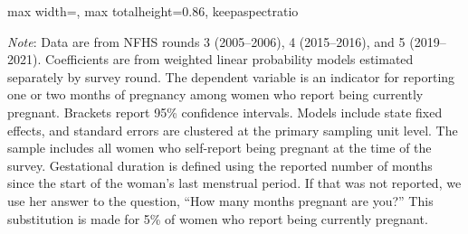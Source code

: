 \documentclass[10pt,twoside,reqno]{article}
\begin{document}
\begin{table}[H]
\sansmath
\sffamily
\captionsetup{style=CAPTAB}
\caption{Women reporting one or two months of pregnancy differ from women reporting later pregnancy}
\label{tab:earlypregnancy}
\vspace{-8pt}

\begin{center}
\begin{scriptsize}
\setlength{\tabcolsep}{10pt}
\renewcommand{\arraystretch}{0.9}
\begin{adjustbox}{max width=\textwidth, max totalheight=0.86\textheight, keepaspectratio}

\end{adjustbox}
\end{scriptsize}
\end{center}

\vspace{0.5ex}
\vspace{0.5ex}
\small\scriptsize{\textsf{\textit{Note}: Data are from NFHS rounds 3 (2005--2006), 4 (2015--2016), and 5 (2019--2021). Coefficients are from weighted linear probability models estimated separately by survey round. The dependent variable is an indicator for reporting one or two months of pregnancy among women who report being currently pregnant. Brackets report 95\% confidence intervals. Models include state fixed effects, and standard errors are clustered at the primary sampling unit level.}}
\newline\small\scriptsize{\textsf{The sample includes all women who self-report being pregnant at the time of the survey.}}
\newline\small\scriptsize{\textsf{Gestational duration is defined using the reported number of months since the start of the woman's last menstrual period. If that was not reported, we use her answer to the question, ``How many months pregnant are you?'' This substitution is made for 5\% of women who report being currently pregnant.}}
\end{table}

\clearpage

\renewcommand{\thesection}{C}

\setcounter{equation}{0}
\renewcommand{\theequation}{C-\arabic{equation}}
\end{document}
